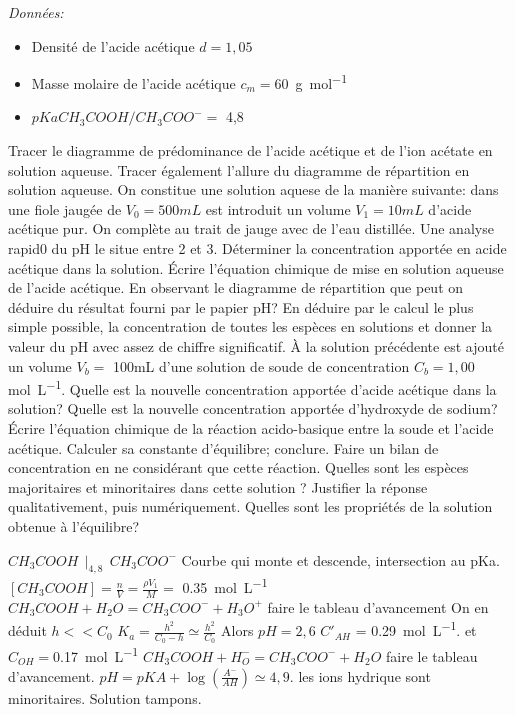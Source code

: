 \begin{Exercise}[title=Étude du couple méthanoique]
	\emph{Données:}
	\begin{itemize}
		\item Densité de l'acide acétique $d=1,05$
		\item Masse molaire de l'acide acétique $c_m=$\SI{60}{\g\per\mol}
		\item $pKa CH_3COOH/CH_3COO^- = $ 4,8
	\end{itemize}
	\Question Tracer le diagramme de prédominance de l'acide acétique et de l'ion acétate en solution aqueuse.
	\Question Tracer  également l'allure du diagramme de répartition en solution aqueuse.
	\Question On constitue une solution aquese de la manière suivante: dans une fiole jaugée de $V_0=500mL$ est introduit un volume $V_1=10mL$ d'acide acétique pur. On complète au trait de jauge avec de l'eau distillée. Une analyse rapid0 du pH le situe entre 2 et 3.
	\subQuestion Déterminer la concentration apportée en acide acétique dans la solution.
	\subQuestion Écrire l'équation chimique de mise en solution aqueuse de l'acide acétique.
	\subQuestion En observant le diagramme de répartition que peut on déduire du résultat fourni par le papier pH?
	\subQuestion En déduire par le calcul le plus simple possible, la concentration de toutes les espèces en solutions et donner la valeur du pH avec assez de chiffre significatif.
	\Question À la solution précédente est ajouté un volume $V_b=$ 100mL d'une solution de soude de concentration $C_b=1,00$ \si{\mol\per\L}.
	\subQuestion Quelle est la nouvelle concentration apportée d'acide acétique dans la solution?
	\subQuestion Quelle est la nouvelle concentration apportée d'hydroxyde de sodium?
	\subQuestion Écrire l'équation chimique de la réaction acido-basique entre la soude et l'acide acétique. Calculer sa constante d'équilibre; conclure. Faire un bilan de concentration en ne considérant que cette réaction.
	\subQuestion Quelles sont les espèces majoritaires et minoritaires dans cette solution ? Justifier la réponse qualitativement, puis numériquement.
	\subQuestion Quelles sont les propriétés de la solution obtenue à l'équilibre?
\end{Exercise}
\begin{Answer}
	\Question $CH_3COOH ~ ~|_{4,8} ~ ~CH_3COO^-$
	\Question Courbe qui monte et descende, intersection au pKa.
	\Question
	\subQuestion $[CH_3COOH]=\frac{n}{V}=\frac{\rho V_1}{M} =$ \SI{0.35}{\mol\per\L}
	\subQuestion $CH_3COOH + H_2O = CH_3COO^- + H_3O^+$ faire le tableau d'avancement
	\subQuestion On en déduit $h<< C_0$
	\subQuestion $K_a =\frac{h^2}{C_0-h} \simeq \frac{h^2}{C_0}$ Alors $pH=2,6$
	\Question
	\subQuestion \subQuestion  $C'_{AH}$ = \SI{0.29}{\mol\per\L}. et $C_{OH}=$\SI{0.17}{\mol\per\L}
	\subQuestion $CH_3COOH + H_O^- = CH_3COO^- + H_2O$ faire le tableau d'avancement.
	\subQuestion $pH= pKA + \log(\frac{A^-}{AH}) \simeq 4,9$.
	\subQuestion les ions hydrique sont minoritaires.
	\subQuestion Solution tampons.

\end{Answer}
